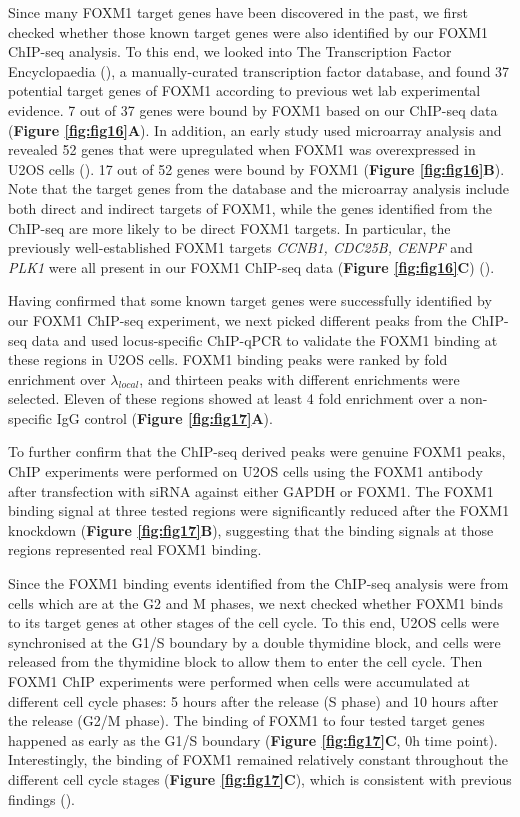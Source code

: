 Since many FOXM1 target genes have been discovered in the past, we first checked whether those known target genes were also identified by our FOXM1 ChIP-seq analysis. To this end, we looked into The Transcription Factor Encyclopaedia (\cite{yusuf2012the}), a manually-curated transcription factor database, and found 37 potential target genes of FOXM1 according to previous wet lab experimental evidence. 7 out of 37 genes were bound by FOXM1 based on our ChIP-seq data (\textbf{Figure \ref{fig:fig16}A}). In addition, an early study used microarray analysis and revealed 52 genes that were upregulated when FOXM1 was overexpressed in U2OS cells (\cite{laoukili2005foxm1}). 17 out of 52 genes were bound by FOXM1 (\textbf{Figure \ref{fig:fig16}B}). Note that the target genes from the database and the microarray analysis include both direct and indirect targets of FOXM1, while the genes identified from the ChIP-seq are more likely to be direct FOXM1 targets. In particular, the previously well-established FOXM1 targets \textit{CCNB1, CDC25B, CENPF} and \textit{PLK1} were all present in our FOXM1 ChIP-seq data (\textbf{Figure \ref{fig:fig16}C}) (\cite{laoukili2005foxm1,wang2005forkhead}).

Having confirmed that some known target genes were successfully identified by our FOXM1 ChIP-seq experiment, we next picked different peaks from the ChIP-seq data and used locus-specific ChIP-qPCR to validate the FOXM1 binding at these regions in U2OS cells. FOXM1 binding peaks were ranked by fold enrichment over $\lambda_{local}$, and thirteen peaks with different enrichments were selected. Eleven of these regions showed at least 4 fold enrichment over a non-specific IgG control (\textbf{Figure \ref{fig:fig17}A}).

To further confirm that the ChIP-seq derived peaks were genuine FOXM1 peaks, ChIP experiments were performed on U2OS cells using the FOXM1 antibody after transfection with siRNA against either GAPDH or FOXM1. The FOXM1 binding signal at three tested regions were significantly reduced after the FOXM1 knockdown (\textbf{Figure \ref{fig:fig17}B}), suggesting that the binding signals at those regions represented real FOXM1 binding.

Since the FOXM1 binding events identified from the ChIP-seq analysis were from cells which are at the G2 and M phases, we next checked whether FOXM1 binds to its target genes at other stages of the cell cycle. To this end, U2OS cells were synchronised at the G1/S boundary by a double thymidine block, and cells were released from the thymidine block to allow them to enter the cell cycle. Then FOXM1 ChIP experiments were performed when cells were accumulated at different cell cycle phases: 5 hours after the release (S phase) and 10 hours after the release (G2/M phase). The binding of FOXM1 to four tested target genes happened as early as the G1/S boundary (\textbf{Figure \ref{fig:fig17}C}, 0h time point). Interestingly, the binding of FOXM1 remained relatively constant throughout the different cell cycle stages (\textbf{Figure \ref{fig:fig17}C}), which is consistent with previous findings (\cite{laoukili2008activation}).

